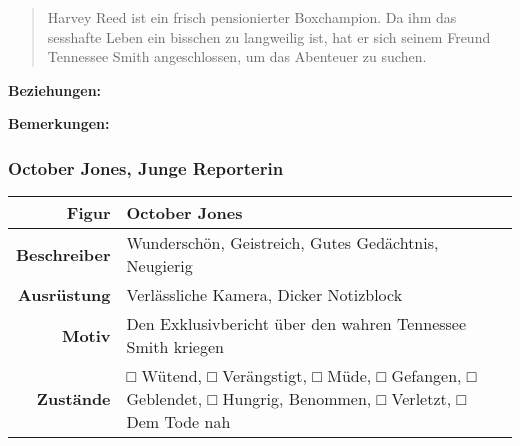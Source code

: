 \documentclass[]{article}
\begin{document}
\begin{quote}
Harvey Reed ist ein frisch pensionierter Boxchampion. Da ihm das
sesshafte Leben ein bisschen zu langweilig ist, hat er sich seinem
Freund Tennessee Smith angeschlossen, um das Abenteuer zu suchen.
\end{quote}

\textbf{Beziehungen:}

\textbf{Bemerkungen:}

\subsubsection{October Jones, Junge
Reporterin}\label{october-jones-junge-reporterin}

\begin{longtable}[]{@{}rl@{}}
\toprule
\begin{minipage}[b]{0.14\columnwidth}\raggedleft\strut
Figur
\strut\end{minipage} &
\begin{minipage}[b]{0.80\columnwidth}\raggedright\strut
October Jones
\strut\end{minipage}\tabularnewline
\midrule
\endhead
\begin{minipage}[t]{0.14\columnwidth}\raggedleft\strut
\textbf{Beschreiber}
\strut\end{minipage} &
\begin{minipage}[t]{0.80\columnwidth}\raggedright\strut
Wunderschön, Geistreich, Gutes Gedächtnis, Neugierig
\strut\end{minipage}\tabularnewline
\begin{minipage}[t]{0.14\columnwidth}\raggedleft\strut
\textbf{Ausrüstung}
\strut\end{minipage} &
\begin{minipage}[t]{0.80\columnwidth}\raggedright\strut
Verlässliche Kamera, Dicker Notizblock
\strut\end{minipage}\tabularnewline
\begin{minipage}[t]{0.14\columnwidth}\raggedleft\strut
\textbf{Motiv}
\strut\end{minipage} &
\begin{minipage}[t]{0.80\columnwidth}\raggedright\strut
Den Exklusivbericht über den wahren Tennessee Smith kriegen
\strut\end{minipage}\tabularnewline
\begin{minipage}[t]{0.14\columnwidth}\raggedleft\strut
\textbf{Zustände}
\strut\end{minipage} &
\begin{minipage}[t]{0.80\columnwidth}\raggedright\strut
□ Wütend, □ Verängstigt, □ Müde, □ Gefangen, □ Geblendet, □ Hungrig,
Benommen, □ Verletzt, □ Dem Tode nah
\strut\end{minipage}\tabularnewline
\bottomrule
\end{longtable}
\end{document}
